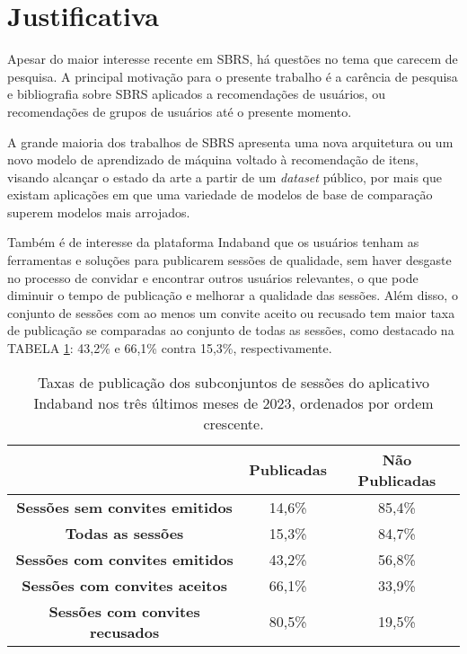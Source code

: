 \section{Justificativa}

Apesar do maior interesse recente em SBRS, há questões no tema que carecem de
 pesquisa. A principal motivação para o presente trabalho é a carência de
 pesquisa e bibliografia sobre SBRS aplicados a recomendações de usuários, ou
 recomendações de grupos de usuários até o presente momento.
 
 A grande maioria dos trabalhos de SBRS apresenta uma nova arquitetura ou um
 novo modelo de aprendizado de máquina voltado à recomendação de itens, visando
 alcançar o estado da arte a partir de um \textit{dataset} público, por mais que
 existam aplicações em que uma variedade de modelos de base de comparação
 superem modelos mais arrojados.
 
 Também é de interesse da plataforma Indaband que os usuários tenham as
 ferramentas e soluções para publicarem sessões de qualidade, sem haver desgaste
 no processo de convidar e encontrar outros usuários relevantes, o que pode
 diminuir o tempo de publicação e melhorar a qualidade das sessões. Além disso,
 o conjunto de sessões com ao menos um convite aceito ou recusado tem maior taxa
 de publicação se comparadas ao conjunto de todas as sessões, como destacado na
 TABELA \ref{tab:publicacao_sessoes}: 43,2\% e 66,1\% contra 15,3\%, respectivamente.
\begin{table}[htbp]
    \centering
    \begin{tabular}{|c|c|c|}
        \hline
        & \textbf{Publicadas} & \textbf{Não Publicadas} \\
        \hline
        \textbf{Sessões sem convites emitidos} & 14,6\% & 85,4\% \\
        \hline
        \textbf{Todas as sessões} & 15,3\% & 84,7\% \\ 
        \hline
        \textbf{Sessões com convites emitidos} & 43,2\% & 56,8\% \\ 
        \hline
        \textbf{Sessões com convites aceitos} & 66,1\% & 33,9\% \\
        \hline
        \textbf{Sessões com convites recusados} & 80,5\% & 19,5\% \\
        \hline
    \end{tabular}
    \caption{Taxas de publicação dos subconjuntos de sessões do aplicativo Indaband nos três últimos meses de 2023,
    ordenados por ordem crescente.
    }
    \label{tab:publicacao_sessoes}
\end{table}


